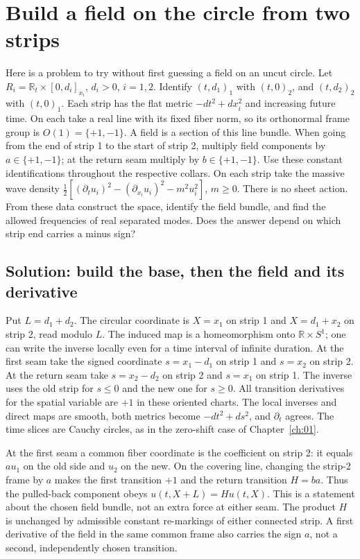 \section{Build a field on the circle from two strips}\label{D-capstone}
Here is a problem to try without first guessing a field on an uncut circle. Let $R_i=\mathbb R_t\times[0,d_i]_{x_i}$, $d_i>0$, $i=1,2$. Identify $(t,d_1)_1$ with $(t,0)_2$, and $(t,d_2)_2$ with $(t,0)_1$. Each strip has the flat metric $-dt^2+dx_i^2$ and increasing future time. On each take a real line with its fixed fiber norm, so its orthonormal frame group is $O(1)=\{+1,-1\}$. A field is a section of this line bundle. When going from the end of strip 1 to the start of strip 2, multiply field components by $a\in\{+1,-1\}$; at the return seam multiply by $b\in\{+1,-1\}$. Use these constant identifications throughout the respective collars. On each strip take the massive wave density $\tfrac12[(\partial_t u_i)^2-(\partial_{x_i}u_i)^2-m^2u_i^2]$, $m\geq0$. There is no sheet action. From these data construct the space, identify the field bundle, and find the allowed frequencies of real separated modes. Does the answer depend on which strip end carries a minus sign?

\subsection{Solution: build the base, then the field and its derivative}
Put $L=d_1+d_2$. The circular coordinate is $X=x_1$ on strip 1 and $X=d_1+x_2$ on strip 2, read modulo $L$. The induced map is a homeomorphism onto $\mathbb R\times S^1$; one can write the inverse locally even for a time interval of infinite duration. At the first seam take the signed coordinate $s=x_1-d_1$ on strip 1 and $s=x_2$ on strip 2. At the return seam take $s=x_2-d_2$ on strip 2 and $s=x_1$ on strip 1. The inverse uses the old strip for $s\leq0$ and the new one for $s\geq0$. All transition derivatives for the spatial variable are $+1$ in these oriented charts. The local inverses and direct maps are smooth, both metrics become $-dt^2+ds^2$, and $\partial_t$ agrees. The time slices are Cauchy circles, as in the zero-shift case of Chapter~\ref{ch:01}.

At the first seam a common fiber coordinate is the coefficient on strip 2: it equals $a u_1$ on the old side and $u_2$ on the new. On the covering line, changing the strip-2 frame by $a$ makes the first transition $+1$ and the return transition $H=ba$. Thus the pulled-back component obeys $u(t,X+L)=H u(t,X)$. This is a statement about the chosen field bundle, not an extra force at either seam. The product $H$ is unchanged by admissible constant re-markings of either connected strip. A first derivative of the field in the same common frame also carries the sign $a$, not a second, independently chosen transition.

